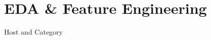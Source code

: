 \documentclass[
 size=12pt,
 paper=smartboard, %
 mode=present, %
 display=slides, %
style=tuliplab,
pauseslide,
fleqn,leqno]{powerdot}
\begin{document}
\section{EDA \& Feature Engineering}
\begin{slide}{Host and Category}
\end{slide}
\end{document}
